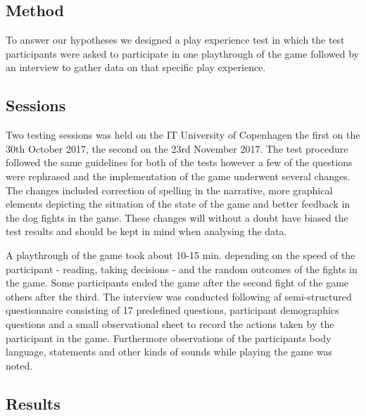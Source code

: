 \subsection{Method}
To answer our hypotheses we designed a play experience test in which the test participants were asked to participate in one playthrough of the game followed by an interview to gather data on that specific play experience.

\subsection{Sessions}
Two testing sessions was held on the IT University of Copenhagen the first on the 30th October 2017, the second on the 23rd November 2017. The test procedure followed the same guidelines for both of the tests however a few of the questions were rephrased and the implementation of the game underwent several changes. The changes included correction of spelling in the narrative, more graphical elements depicting the situation of the state of the game and better feedback in the dog fights in the game. These changes will without a doubt have biased the test results and should be kept in mind when analysing the data.



A playthrough of the game took about 10-15 min. depending on the speed of the participant - reading, taking decisions - and the random outcomes of the fights in the game. Some participants ended the game after the second fight of the game others after the third.  
The interview was conducted following af semi-structured questionnaire consisting of 17 predefined questions, participant demographics questions and a small observational sheet to record the actions taken by the participant in the game. Furthermore observations of the participants body language, statements and other kinds of sounds while playing the game was noted.

\subsection{Results}
\label{testResults}
